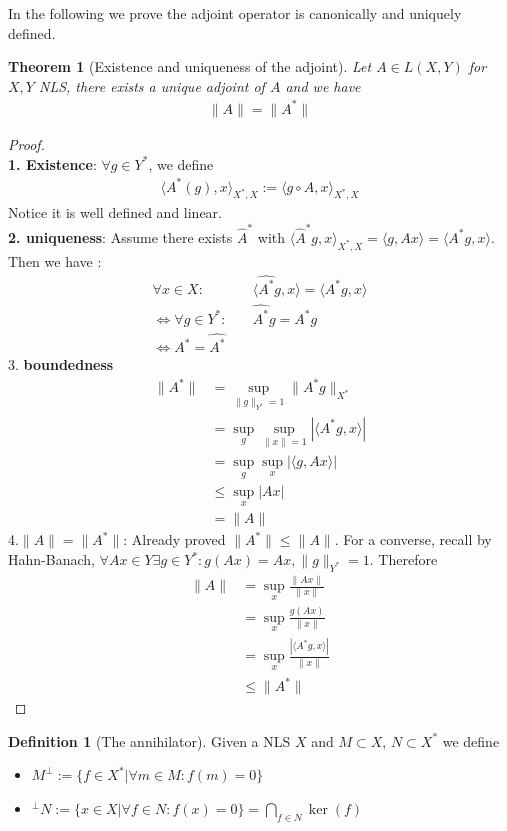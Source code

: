 \documentclass[a4paper,11pt,fleqn]{book}
\newtheorem{theorem}{Theorem}[section]
\theoremstyle{definition}
\newtheorem{definition}{Definition}[section]
\theoremstyle{remark}
\begin{document}
In the following we prove the adjoint operator is canonically and uniquely defined. 
\begin{theorem}[Existence and uniqueness of the adjoint]
	Let $A \in L(X, Y)$ for $X, Y$ NLS, there exists a unique adjoint of $A$ and we have
	\begin{align*}
		\|A\| = \|A^*\|
	\end{align*}
\end{theorem}
\begin{proof}\quad\\
\textbf{1. Existence}: $\forall g \in Y^*$, we define
\begin{align*}
	\langle A^*(g), x \rangle_{X^*, X} := \langle g \circ A,  x \rangle_{X^*, X}
\end{align*}
Notice it is well defined and linear.\\
\textbf{2. uniqueness}: Assume there exists $\hat{A}^*$ with $\langle \hat{A}^*g, x \rangle_{X^*, X} = \langle g, Ax\rangle = \langle A^*g, x\rangle.$ Then we have :
\begin{align*}
	\forall x \in X: &\quad \langle \hat{A^*}g, x\rangle = \langle A^*g, x \rangle\\
	\Leftrightarrow
	\forall g \in Y^*: &\quad \hat{A^*} g = A^* g\\
	\Leftrightarrow A^* = \hat{A^*} 
\end{align*} 
3. \textbf{boundedness}
\begin{align*}
	\|A^*\| &= \sup_{\|g\|_{Y^*} = 1} \|A^* g\|_{X^*}\\
	&= \sup_g \sup_{\|x\| = 1}|\langle A^*g, x \rangle|\\
	&= \sup_g \sup_x |\langle g, Ax\rangle|\\
	&\le \sup_x |Ax|\\
	&= \|A\|
\end{align*}
4.$\|A\| = \|A^*\|$: Already proved $\|A^*\| \le \|A\|$. For a converse, recall by Hahn-Banach, $\forall Ax \in Y \exists g \in Y^*: g(Ax) = Ax, \|g\|_{Y^*} = 1$. Therefore
\begin{align*}
	\|A\| &= \sup_x \frac{\|Ax\|}{\|x\|}\\
	&= \sup_x\frac{g(Ax)}{\|x\|}\\
	&= \sup_x \frac{|\langle A^*g , x\rangle |}{\|x\|}\\
	&\le \|A^*\|
\end{align*}
\end{proof}

\begin{definition}[The annihilator]
Given a NLS $X$ and $M \subset X$, $N \subset X^*$ we define
\begin{itemize}
	\item $M^\perp := \{f \in X^*| \forall m \in M: f(m) = 0\}$
	\item ${}^\perp N:= \{x \in X| \forall f \in N: f(x) = 0\} = \bigcap_{f \in N} \ker (f)$
\end{itemize}
\end{definition}
\end{document}
